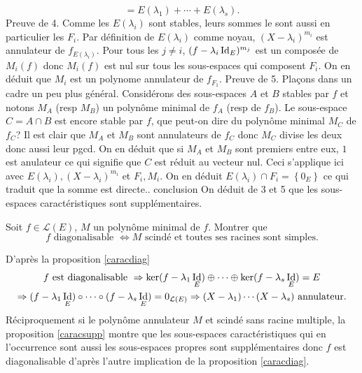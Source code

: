 \begin{demo}
\[  = E(\lambda_1) + \cdots + E(\lambda_s).
\]
Preuve de 4.\newline
Comme les $E(\lambda_i)$ sont stables, leurs sommes le sont aussi en particulier les $F_i$.\newline
Par définition de $E(\lambda_i)$ comme noyau, $(X-\lambda_i)^{m_i}$ est annulateur de $f_{E(\lambda_i)}$. Pour tous les $j\neq i$, $(f-\lambda_i\mathop{\mathrm{Id}}_E)^{m_j}$ est un composée de $M_i(f)$ donc $M_i(f)$ est nul sur tous les sous-espaces qui composent $F_i$. On en déduit que $M_i$ est un polynome annulateur de $f_{F_1}$.\medskip\newline
Preuve de 5.\newline
Plaçons dans un cadre un peu plus général. Considérons des sous-espaces $A$ et $B$ stables par $f$ et notons $M_A$ (resp $M_B$) un polynôme minimal de $f_A$ (resp de $f_B$). Le sous-espace $C = A\cap B$ est encore stable par $f$, que peut-on dire du polynôme minimal $M_C$ de $f_C$?\newline
Il est clair que $M_A$ et $M_B$ sont annulateurs de $f_C$ donc $M_C$ divise les deux donc aussi leur pgcd. On en déduit que si $M_A$ et $M_B$ sont premiers entre eux, $1$ est anulateur ce qui signifie que $C$ est réduit au vecteur nul.\newline
Ceci s'applique ici avec $E(\lambda_i),(X-\lambda_i)^{m_i}$ et $F_i,M_i$. On en déduit $E(\lambda_i) \cap F_i = \left\lbrace 0_E \right\rbrace$ ce qui traduit que la somme est directe.\medskip{}. conclusion\newline
On déduit de 3 et 5 que les sous-espaces caractéristiques sont supplémentaires.
\end{demo}

\begin{propn}
  Soit $f\in \mathcal{L}(E)$, $M$ un polynôme minimal de $f$. Montrer que 
\[
  f \text{ diagonalisable } \Leftrightarrow M \text{ scindé et toutes ses racines sont simples}.
\]
\end{propn}
\begin{demo}
D'après la proposition \ref{caracdiag}
\begin{multline*}
  f \text{ est diagonalisable } \Rightarrow \ker(f-\lambda_1 \mathop{\mathrm{Id}}_E) \oplus \cdots \oplus \ker(f-\lambda_s \mathop{\mathrm{Id}}_E) = E  \\
  \Rightarrow (f-\lambda_1 \mathop{\mathrm{Id}}_E) \circ \cdots \circ (f-\lambda_s \mathop{\mathrm{Id}}_E) = 0_{\mathcal{L}(E)}
  \Rightarrow (X-\lambda_1)\cdots (X-\lambda_s) \text{ annulateur}.
\end{multline*}
Réciproquement si le polynôme annulateur $M$ et scindé sans racine multiple, la proposition \ref{caracsupp} montre que les sous-espaces caractéristiques qui en l'occurrence sont aussi les sous-espaces propres sont supplémentaires donc $f$ est diagonalisable d'après l'autre implication de la proposition \ref{caracdiag}.
\end{demo}



